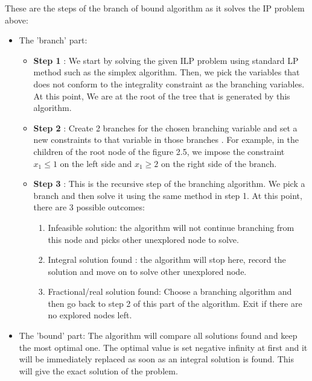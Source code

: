 These are the steps of the branch of bound algorithm as it solves the IP problem above:
\begin{itemize}
\item The 'branch' part:
    \begin{itemize}
        \item \textbf{Step 1} : We start by solving the given ILP problem using standard LP method such as the simplex algorithm. Then, we pick the
         variables that does not conform to the integrality constraint as the branching variables. At this point, We are at the root of
         the tree that is generated by this algorithm.
        \item \textbf{Step 2} : Create 2 branches for the chosen branching variable and set a new constraints to that variable in those branches
        . For example, in the children of the root node of the figure 2.5,
         we impose the constraint \(x_{1} \leq 1\) on the left side and \(x_{1} \geq 2\) on the right side of the branch.
        \item \textbf{Step 3} : This is the recursive step of the branching algorithm. We pick a branch and then solve it
        using the same method in step 1. At this point, there are 3 possible outcomes:
            \begin{enumerate}
                \item Infeasible solution: the algorithm will not continue branching from this node and picks other unexplored node
                to solve.
                \item Integral solution found : the algorithm will stop here, record the solution and move on to solve other unexplored node.
                \item Fractional/real solution found: Choose a branching algorithm and then go back to step 2 of this part of the algorithm.
                Exit if there are no explored nodes left.
            \end{enumerate}
    \end{itemize}
\item The 'bound' part: The algorithm will compare all solutions found and keep the most optimal one. The optimal value is set negative infinity at first
and it will be immediately replaced as soon as an integral solution is found.
 This will give the exact solution of the problem.
\end{itemize}

\vspace{0.5cm}

